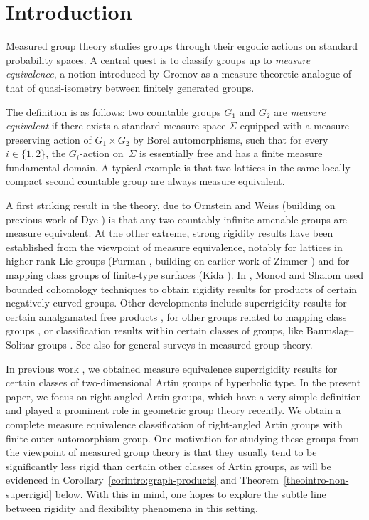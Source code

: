 \section*{Introduction}

Measured group theory studies groups through their ergodic actions on standard probability spaces.
A central quest is to classify groups up to \emph{measure equivalence}, a notion introduced by Gromov \cite{Gro} as a measure-theoretic analogue of that of quasi-isometry between finitely generated groups.

The definition is as follows: two countable groups $G_1$ and $G_2$ are \emph{measure equivalent} if there exists a standard measure space $\Sigma$ equipped with a measure-preserving action of $G_1\times G_2$ by Borel automorphisms, such that for every $i\in\{1,2\}$, the $G_i$-action on~$\Sigma$ is essentially free and has a finite measure fundamental domain. A typical example is that two lattices in the same locally compact second countable group are always measure equivalent.

A first striking result in the theory, due to Ornstein and Weiss \cite{OW} (building on previous work of Dye \cite{Dye1,Dye2}) is that any two countably infinite amenable groups are measure equivalent. At the other extreme, strong rigidity results have been established from the viewpoint of measure equivalence, notably for lattices in higher rank Lie groups (Furman \cite{Fur}, building on earlier work of Zimmer \cite{Zim1,Zim2}) and for mapping class groups of finite-type surfaces (Kida \cite{Kid}). In \cite{MS}, Monod and Shalom used bounded cohomology techniques to obtain rigidity results for products of certain negatively curved groups. Other developments include superrigidity results for certain amalgamated free products \cite{Kid2}, for other groups related to mapping class groups \cite{CK}, or classification results within certain classes of groups, like Baumslag--Solitar groups \cite{kida2014invariants,HR}. See also \cite{Sha-survey,Gab-survey,Fur-survey} for general surveys in measured group theory.

In previous work \cite{HH}, we obtained measure equivalence superrigidity results for certain classes of two-dimensional Artin groups of hyperbolic type. In the present paper, we focus on right-angled Artin groups, which have a very simple definition and played a prominent role in geometric group theory recently.
We obtain a complete measure equivalence classification of right-angled Artin groups with finite outer automorphism group. One motivation for studying these groups from the viewpoint of measured group theory is that they usually tend to be significantly less rigid than certain other classes of Artin groups, as will be evidenced in Corollary~\ref{corintro:graph-products} and Theorem~\ref{theointro-non-superrigid} below. With this in mind, one hopes to explore the subtle line between rigidity and flexibility phenomena in this setting.

